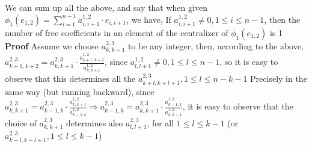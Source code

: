 \documentclass[12pt]{article}
\begin{document}
We can sum up all the above, and say that when given \newline
$\phi_1(e_{1,2})=\sum_{i=1}^{n-1} a_{i,i+1}^{1,2} \cdot e_{i,i+1}$, we have, \newline
If $a_{i,i+1}^{1,2} \neq 0, 1 \leq i \leq n-1$, then the number of free coefficients in an element of the centralizer of $\phi_1(e_{1,2})$ is 1 \newline
\textbf{Proof} \newline
Assume we choose $a_{k,k+1}^{2,3}$ to be any integer, then, according to the above, \newline
$a_{k+1,k+2}^{2,3}=a_{k,k+1}^{2,3} \cdot \frac{a_{k+1,k+2}^{1,2}}{a_{k,k+1}^{1,2}}$, since 
$a_{l,l+1}^{1,2} \neq 0, 1 \leq l \leq n-1$, so it is easy to observe that this 
determines all the $a_{k+l,k+l+1}^{2,3}, 1 \leq l \leq n-k-1$ \newline
Precisely in the same way (but running backward), \newline since $a_{k,k+1}^{2,3}=a_{k-1,k}^{2,3} \cdot \frac{a_{k,k+1}^{1,2}}{a_{k-1,k}^{1,2}} \Rightarrow a_{k-1,k}^{2,3}=a_{k,k+1}^{2,3} \cdot \frac{a_{k-1,k}^{1,2}}{a_{k,k+1}^{1,2}}$, it is easy to observe that the choice of $a_{k,k+1}^{2,3}$ determines also $a_{l,l+1}^{2,3}$, for all $1 \leq l \leq k-1$ \newline
(or $a_{k-l,k-l+1}^{2,3}, 1 \leq l \leq k-1$) \newline
\end{document}
